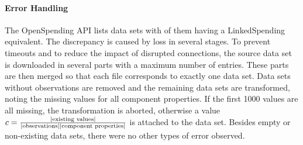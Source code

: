\documentclass[sw]{iosart2x}
\begin{document}



\paragraph{Error Handling}
The OpenSpending API lists \numberofopenspendingdatasets{} data sets with \numberofdatasets{} of them having a LinkedSpending equivalent.
The discrepancy is caused by loss in several stages.
To prevent timeouts and to reduce the impact of disrupted connections, the source data set is downloaded in several parts with a maximum number of entries.
These parts are then merged so that each file corresponds to exactly one data set.
Data sets without observations are removed and the remaining data sets are transformed, noting the missing values for all component properties.
If the first 1000 values are all missing, the transformation is aborted, otherwise a  value $c = \frac{|\textnormal{existing values}|}{|\textnormal{observations}||\textnormal{component properties}|}$ is attached to the data set.
Besides empty or non-existing data sets, there were no other types of error observed.

\end{document}
